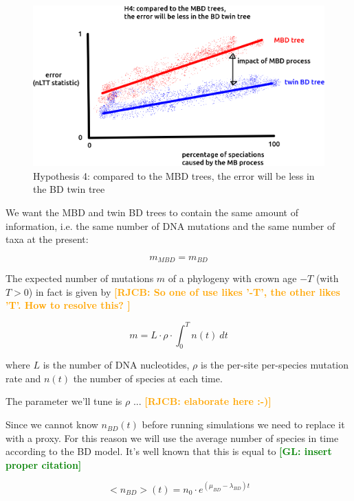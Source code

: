 \documentclass{article}
\newcommand*\richel[1]{\textcolor{orange}{\textbf{[RJCB: #1]}}}
\newcommand*\gio[1]{\textcolor{green}{\textbf{[GL: #1]}}}
\begin{document}
\begin{itemize}
\begin{figure}[!htbp]
  \includegraphics[width=\textwidth]{fig_h_4.png}
  \caption{
    Hypothesis 4: compared to the MBD trees, 
    the error will be less in the BD twin tree
  }
  \label{fig_h_4}
\end{figure}


We want the MBD and twin BD trees to contain the same amount of information, 
i.e. the same number of DNA mutations and the same number of taxa at the present:

\begin{equation}
m_{MBD} = m_{BD} \label{m equivalence}
\end{equation} 

The expected number of mutations $m$ of a phylogeny 
with crown age $-T$ (with $T>0$) in fact is given by
\richel{
  So one of use likes '-T', the other likes 'T'. How to resolve this?
}

\begin{equation}
m = L \cdot \rho \cdot \int_{0}^{T} n(t)\ dt \label{m calculation}
\end{equation}

where $L$ is the number of DNA nucleotides, 
$\rho$ is the per-site per-species mutation rate and
$n(t)$ the number of species at each time.

The parameter we'll tune is $\rho$ ... \richel{elaborate here :-)}

Since we cannot know $n_{BD}(t)$ before running simulations
we need to replace it with a proxy. 
For this reason we will use the average number of
species in time according to the BD model. 
It's well known that this is equal to \gio{insert proper citation}

\begin{equation}
    <n_{BD}>(t) = n_{0} \cdot e^{(\mu_{BD} - \lambda_{BD})t} \label{BD average n}
\end{equation}


\end{itemize}
\end{document}
